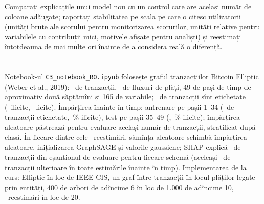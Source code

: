 \begin{decision}
%
{Comparați explicațiile unui model nou cu un control care are același număr de coloane adăugate; raportați stabilitatea pe scala pe care o citesc utilizatorii (unități brute ale scorului pentru monitorizarea scorurilor, unități relative pentru variabilele cu contribuții mici, motivele afișate pentru analiști) și reestimați întotdeauna de mai multe ori înainte de a considera reală o diferență.}
\end{decision}

\section{}
%
{Notebook-ul \texttt{C3\_notebook\_RO.ipynb} folosește graful tranzacțiilor Bitcoin Elliptic (Weber et al., 2019): \NnTx\ de tranzacții, \NnEdges\ de fluxuri de plăți, 49 de pași de timp de aproximativ două săptămîni și 165 de variabile; \NnLab\ de tranzacții sînt etichetate (\NnIllicit\ ilicite, \NnLicit\ licite).
Împărțirea înainte în timp: antrenare pe pașii 1--34 (\NnTrain\ de tranzacții etichetate, \NillTrain\,\% ilicite), test pe pașii 35--49 (\NnTest, \NillTest\,\% ilicite); împărțirea aleatoare păstrează pentru evaluare același număr de tranzacții, stratificat după clasă.
În fiecare dintre cele \NnSeeds\ reestimări, sămînța aleatoare schimbă împărțirea aleatoare, inițializarea GraphSAGE și valorile gaussiene; SHAP explică \NnExpl\ de tranzacții din eșantionul de evaluare pentru fiecare schemă (aceleași \NnExpl\ de tranzacții ulterioare în toate estimările înainte în timp).
Implementarea de la curs: Elliptic în loc de IEEE-CIS, un graf între tranzacții în locul plăților legate prin entități, 400 de arbori de adîncime 6 în loc de 1.000 de adîncime 10, \NnSeeds\ reestimări în loc de 20.}

